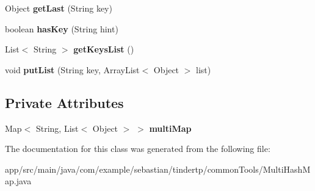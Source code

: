 \begin{DoxyCompactItemize}
\item 
Object {\bfseries get\+Last} (String key)\hypertarget{classcom_1_1example_1_1sebastian_1_1tindertp_1_1commonTools_1_1MultiHashMap_aee1a1f123c2054cd4940fcd63433f3e8}{}\label{classcom_1_1example_1_1sebastian_1_1tindertp_1_1commonTools_1_1MultiHashMap_aee1a1f123c2054cd4940fcd63433f3e8}

\item 
boolean {\bfseries has\+Key} (String hint)\hypertarget{classcom_1_1example_1_1sebastian_1_1tindertp_1_1commonTools_1_1MultiHashMap_a404c4dcfd6a8a580a9c87157502f4b25}{}\label{classcom_1_1example_1_1sebastian_1_1tindertp_1_1commonTools_1_1MultiHashMap_a404c4dcfd6a8a580a9c87157502f4b25}

\item 
List$<$ String $>$ {\bfseries get\+Keys\+List} ()\hypertarget{classcom_1_1example_1_1sebastian_1_1tindertp_1_1commonTools_1_1MultiHashMap_a561171e0f69d463c024fd637dfe18ad8}{}\label{classcom_1_1example_1_1sebastian_1_1tindertp_1_1commonTools_1_1MultiHashMap_a561171e0f69d463c024fd637dfe18ad8}

\item 
void {\bfseries put\+List} (String key, Array\+List$<$ Object $>$ list)\hypertarget{classcom_1_1example_1_1sebastian_1_1tindertp_1_1commonTools_1_1MultiHashMap_a73b4b398bee6342a92bc96aee581ae26}{}\label{classcom_1_1example_1_1sebastian_1_1tindertp_1_1commonTools_1_1MultiHashMap_a73b4b398bee6342a92bc96aee581ae26}

\end{DoxyCompactItemize}
\subsection*{Private Attributes}
\begin{DoxyCompactItemize}
\item 
Map$<$ String, List$<$ Object $>$ $>$ {\bfseries multi\+Map}\hypertarget{classcom_1_1example_1_1sebastian_1_1tindertp_1_1commonTools_1_1MultiHashMap_ac4c741dbf812ac437434af8af3b0676a}{}\label{classcom_1_1example_1_1sebastian_1_1tindertp_1_1commonTools_1_1MultiHashMap_ac4c741dbf812ac437434af8af3b0676a}

\end{DoxyCompactItemize}


The documentation for this class was generated from the following file\+:\begin{DoxyCompactItemize}
\item 
app/src/main/java/com/example/sebastian/tindertp/common\+Tools/Multi\+Hash\+Map.\+java\end{DoxyCompactItemize}
